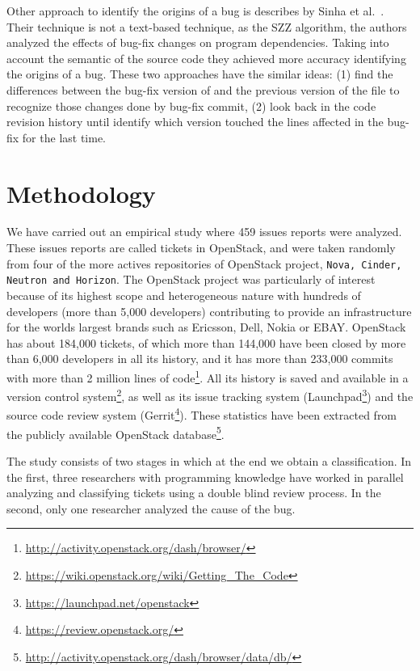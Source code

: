 \documentclass[ifip]{svmult}
\begin{document}
Other approach to identify the origins of a bug is describes by Sinha et al.~\cite{sinha2010buginnings}. Their technique is not a text-based technique, as the SZZ algorithm, the authors analyzed the effects of bug-fix changes on program dependencies. Taking into account the semantic of the source code they achieved more accuracy identifying the origins of a bug. These two approaches have the similar ideas: (1) find the differences between the bug-fix version of and the previous version of the file to recognize those changes done by bug-fix commit, (2) look back in the code revision history until identify which version touched the lines affected in the bug-fix for the last time.


\section{Methodology}
\label{sec:methodology}

We have carried out an empirical study where 459 issues reports were analyzed. These issues reports are called tickets in OpenStack, and were taken randomly from four of the more actives repositories of OpenStack project, \texttt{Nova, Cinder, Neutron and Horizon}. The OpenStack project was particularly of interest because of its highest scope and heterogeneous nature with hundreds of developers (more than 5,000 developers) contributing to provide an infrastructure for the worlds largest brands such as Ericsson, Dell, Nokia or EBAY. OpenStack has about 184,000 tickets, of which more than 144,000 have been closed by more than 6,000 developers in all its history, and it has more than 233,000 commits with more than 2 million lines of code\footnote{\url{http://activity.openstack.org/dash/browser/}}. All its history is saved and available in a version control system\footnote{\url{https://wiki.openstack.org/wiki/Getting_The_Code}}, as well as its issue tracking system (Launchpad\footnote{\url{https://launchpad.net/openstack}}) and the source code review system (Gerrit\footnote{\url{https://review.openstack.org/}}). These statistics have been extracted from the publicly available OpenStack database\footnote{\url{http://activity.openstack.org/dash/browser/data/db/}}. 

The study consists of two stages in which at the end we obtain a classification. In the first, three researchers with programming knowledge have worked in parallel analyzing and classifying tickets using a double blind review process. In the second, only one researcher analyzed the cause of the bug.
\end{document}
